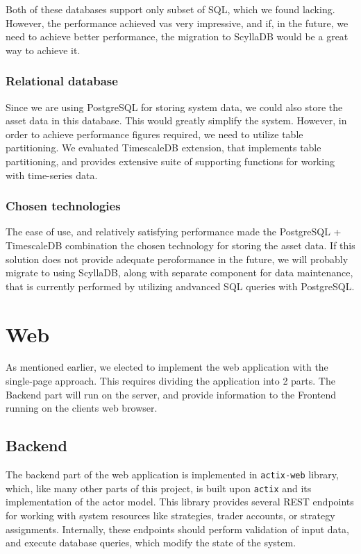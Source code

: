 Both of these databases support only subset of SQL, which we found lacking. However, the
performance achieved vas very impressive, and if, in the future, we need to achieve better performance,
the migration to ScyllaDB would be a great way to achieve it.
\subsubsection{Relational database}
Since we are using PostgreSQL for storing system data, we could also store the asset data in this database.
This would greatly simplify the system. However, in order to achieve performance figures required, we need to
utilize table partitioning. We evaluated TimescaleDB extension, that implements table partitioning,
and provides extensive suite of supporting functions for working with time-series data.

\subsubsection{Chosen technologies}
The ease of use, and relatively satisfying performance made the PostgreSQL + TimescaleDB combination the
chosen technology for storing the asset data. If this solution does not provide adequate peroformance
in the future, we will probably migrate to using ScyllaDB, along with separate component for data maintenance,
that is currently performed by utilizing andvanced SQL queries with PostgreSQL.


\section{Web}
As mentioned earlier, we elected to implement the web application with the single-page approach. This requires dividing
the application into 2 parts. The Backend part will run on the server, and provide information to the Frontend running on the
clients web browser.

\subsection{Backend}
The backend part of the web application is implemented in \verb|actix-web| library, which, like many other parts of this project,
is built upon \verb|actix| and its implementation of the actor model. This library provides several REST endpoints
for working with system resources like strategies, trader accounts, or strategy assignments. Internally,
these endpoints should perform validation of input data, and execute database queries, which modify the state of the system.

